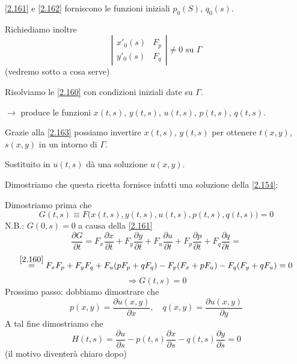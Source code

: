 \documentclass[a4paper,11pt]{report}
\begin{document}
\eqref{2.161} e \eqref{2.162} forniscono le funzioni iniziali $p_0(S)$, $q_0(s)$.

Richiediamo inoltre
\begin{equation}
\left| \begin{matrix}
x'_0(s) & F_p\\
y'_0(s) & F_q
\end{matrix}\right| \neq 0 \text{ su } \Gamma
\label{2.163}
\end{equation}
(vedremo sotto a cosa serve)

Risolviamo le \eqref{2.160} con condizioni iniziali date su $\Gamma$.

$\rightarrow$ produce le funzioni $x(t,s)$, $y(t,s)$, $u(t,s)$, $p(t,s)$, $q(t,s)$.

Grazie alla \eqref{2.163} possiamo invertire $x(t,s)$, $y(t,s)$ per ottenere $t(x,y)$, $s(x,y)$ in un intorno di $\Gamma$. 

Sostituito in $u(t,s)$ d\`a una soluzione $u(x,y)$.

Dimostriamo che questa ricetta fornisce infatti una soluzione della \eqref{2.154}:

Dimostriamo prima che 
\[
G(t,s) \equiv F\big(x(t,s),y(t,s),u(t,s),p(t,s),q(t,s)\big)=0
\]
N.B.: $G(0,s)=0$ a causa della \eqref{2.161}
\[
\frac{\partial G}{\partial t} = F_x \frac{\partial x}{\partial t} + F_y \frac{\partial y}{\partial t} + F_u \frac{\partial u}{\partial t} + F_p \frac{\partial p}{\partial t} + F_q \frac{\partial q}{\partial t}=
\]
\[
\overset{\eqref{2.160}}{=}F_xF_p + F_y F_q + F_u(pF_p + qF_q) - F_p(F_x + pF_u) - F_q(F_y + qF_u)=0
\]
\[
\Rightarrow G(t,s)=0
\]
Prossimo passo: dobbiamo dimostrare che 
\[
p(x,y)=\frac{\partial u(x,y)}{\partial x}, \quad q(x,y)=\frac{\partial u(x,y)}{\partial y}
\]
A tal fine dimostriamo che 
\begin{equation}
H(t,s)=\frac{\partial u}{\partial s} - p(t,s)\frac{\partial x}{\partial s} - q(t,s) \frac{\partial y}{\partial s} =0 
\label{2.164}
\end{equation}
(il motivo diventer\`a chiaro dopo)
\end{document}
